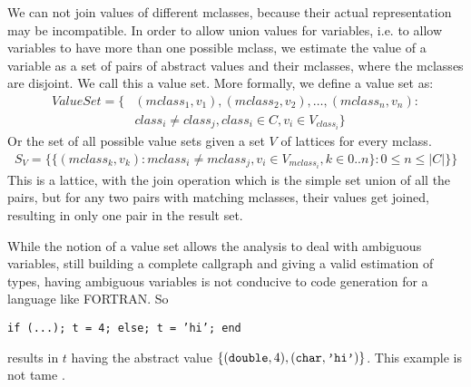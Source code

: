 
We can not join values of different mclasses, because their actual
representation may be incompatible. 
In order to allow union values for variables, i.e. to allow variables to
have more than one possible mclass, we estimate the value of a \matlab
variable as a set of pairs of abstract values and their mclasses,
where the mclasses are disjoint. We call this a value set. More
formally, we define a value set as:
\begin{align*} 
ValueSet = \{&(mclass_1,v_1),(mclass_2,v_2),\ldots,(mclass_n,v_n):\\
&class_i \neq class_j, class_i \in C, v_i \in V_{class_i}\}
\end{align*}
Or the set of all possible value sets given a set $V$ of lattices for every mclass.
\begin{align*}
S_V = \{\{(mclass_k,v_k): mclass_i \neq mclass_j, v_i \in V_{mclass_i}, k \in 0..n\} : 0 \leq n \leq |C|\} \}
\end{align*}
This is a lattice, with the join operation
which is the simple set union of all the pairs, but for any two pairs
with matching mclasses, their values get joined, resulting in only one pair in the result set.

While the notion of a value set allows the analysis to deal with
ambiguous variables, still building a complete callgraph and giving a
valid estimation of types, having ambiguous variables is not conducive
to code generation for a language like {\sc FORTRAN}. So\\
\centerline{{\tt if (...); t = 4; else; t = 'hi'; end} }
results in $t$ having the abstract value $\{({\text{\tt
double}},4), ({\text{\tt char}},{\text{\tt 'hi'}})\}$. This example
is not tame \matlab.

